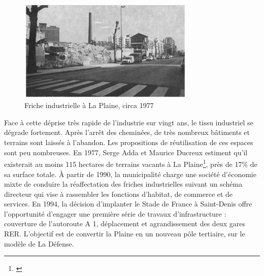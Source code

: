 \documentclass[a4paper,twoside,12pt]{book}
\begin{document}
\begin{figure}[!h]
\centering 
\includegraphics[width=0.75\textwidth]{img/chapitre1/Friche_STD_Photo_Etude_desindustrialisation}
\caption{Friche industrielle à La Plaine, circa 1977}
\end{figure}

Face à cette déprise très rapide de l'industrie sur vingt ans, le tissu industriel se dégrade fortement. Après l'arrêt des cheminées, de très nombreux bâtiments et terrains sont laissés à l'abandon. Les propositions de réutilisation de ces espaces sont peu nombreuses. En 1977, Serge Adda et Maurice Ducreux estiment qu'il existerait au moins 115 hectares de terrains vacants à La Plaine\footnote{\cite{adda_usine_1979}}, près de 17\% de sa surface totale. À partir de 1990, la municipalité charge une société d'économie mixte de conduire la réaffectation des friches industrielles suivant un schéma directeur qui vise à rassembler les fonctions d'habitat, de commerce et de services. En 1994, la décision d'implanter le Stade de France à Saint-Denis offre l'opportunité d'engager une première série de travaux d'infrastructure : couverture de l'autoroute A 1, déplacement et agrandissement des deux gares RER. L'objectif est de convertir la Plaine en un nouveau pôle tertiaire, sur le modèle de La Défense. 
\end{document}
